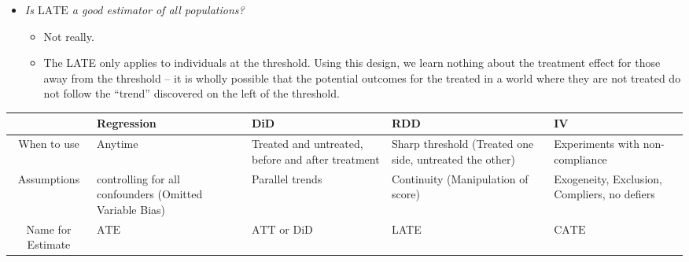 \documentclass[10pt, letterpaper]{article}
\def\ATT{\mathrm{ATT}}
\def\ATE{\mathrm{ATE}}
\def\LATE{\mathrm{LATE}}
\def\CATE{\mathrm{CATE}}
\begin{document}
\begin{multicols}{2}
\begin{itemize}
\begin{itemize}
	\end{itemize}
	\item \textit{Is $\LATE$ a good estimator of all populations?} 
	\begin{itemize}
		\item Not really. 
		\item The LATE only applies to individuals at the threshold. Using this design, we learn nothing about the treatment effect for those away from the threshold -- it is wholly possible that the potential outcomes for the treated in a world where they are not treated do not follow the “trend” discovered on the left of the threshold.
	\end{itemize}
\end{itemize}
\end{multicols}
\thispagestyle{plain}
\hfill
\hfill
\begin{center}\begin{tabular}{c|p{2.5cm}|p{2.5cm}|p{2.4cm}|p{1.9cm}}
	&Regression&DiD&RDD&IV\\\hline
	When to use&Anytime&Treated and untreated, before and after treatment&Sharp threshold (Treated one side, untreated the other)&Experiments with non-compliance\\\hline
	Assumptions&controlling for all confounders (Omitted Variable Bias)&Parallel trends&Continuity (Manipulation of score)&Exogeneity, Exclusion, Compliers, no defiers\\\hline
	Name for Estimate&$\ATE$&$\ATT$ or DiD&LATE&$\CATE$
\end{tabular}\end{center}


\maketitle\thispagestyle{fancy}
\end{document}
